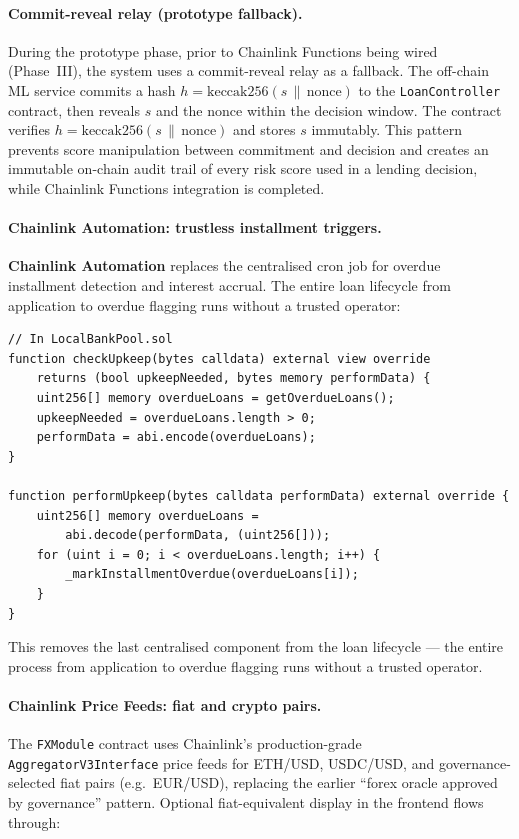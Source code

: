 \documentclass[12pt,a4paper]{report}
\begin{document}
\paragraph{Commit-reveal relay (prototype fallback).}
During the prototype phase, prior to Chainlink Functions being wired (Phase~III), the system uses a commit-reveal relay as a fallback. The off-chain ML service commits a hash $h = \text{keccak256}(s \,\|\, \text{nonce})$ to the \texttt{LoanController} contract, then reveals $s$ and the nonce within the decision window. The contract verifies $h = \text{keccak256}(s \,\|\, \text{nonce})$ and stores $s$ immutably. This pattern prevents score manipulation between commitment and decision and creates an immutable on-chain audit trail of every risk score used in a lending decision, while Chainlink Functions integration is completed.

\paragraph{Chainlink Automation: trustless installment triggers.}
\textbf{Chainlink Automation} replaces the centralised cron job for overdue installment detection and interest accrual. The entire loan lifecycle from application to overdue flagging runs without a trusted operator:

\begin{verbatim}
// In LocalBankPool.sol
function checkUpkeep(bytes calldata) external view override
    returns (bool upkeepNeeded, bytes memory performData) {
    uint256[] memory overdueLoans = getOverdueLoans();
    upkeepNeeded = overdueLoans.length > 0;
    performData = abi.encode(overdueLoans);
}

function performUpkeep(bytes calldata performData) external override {
    uint256[] memory overdueLoans =
        abi.decode(performData, (uint256[]));
    for (uint i = 0; i < overdueLoans.length; i++) {
        _markInstallmentOverdue(overdueLoans[i]);
    }
}
\end{verbatim}

This removes the last centralised component from the loan lifecycle --- the entire process from application to overdue flagging runs without a trusted operator.

\paragraph{Chainlink Price Feeds: fiat and crypto pairs.}
The \texttt{FXModule} contract uses Chainlink's production-grade \texttt{AggregatorV3Interface} price feeds for ETH/USD, USDC/USD, and governance-selected fiat pairs (e.g.\ EUR/USD), replacing the earlier ``forex oracle approved by governance'' pattern. Optional fiat-equivalent display in the frontend flows through:
\end{document}
